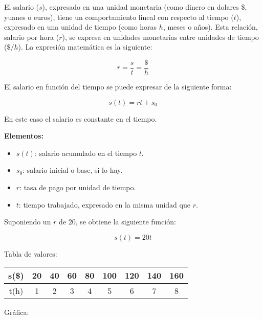 El salario ($s$), expresado en una unidad monetaria (como dinero en dolares \$, yuanes o euros), tiene un comportamiento lineal con respecto al tiempo ($t$), expresado en una unidad de tiempo (como horas $h$, meses o años). Esta relación, salario por hora ($r$), se expresa en unidades monetarias entre unidades de tiempo ($\$/h$). La expresión matemática es la siguiente:

\[
  r = \dfrac{s}{t} = \dfrac{\$}{h}
\]

El salario en función del tiempo se puede expresar de la siguiente forma:

\[\boxed{
  s(t) = rt + s_0
}\]

En este caso el salario es constante en el tiempo.

\textbf{Elementos:}

\begin{itemize}
  \item $s(t)$: salario acumulado en el tiempo $t$.
  \item $s_0$: salario inicial o base, si lo hay.
  \item $r$: tasa de pago por unidad de tiempo.
  \item $t$: tiempo trabajado, expresado en la misma unidad que $r$.
\end{itemize}

Suponiendo un $r$ de 20, se obtiene la siguiente función:

\[
  s(t) = 20t
\]

Tabla de valores:

\begin{center}
\begin{tabular}{|c|c|c|c|c|c|c|c|c|}
  \hline
  s(\$) & 20 & 40 & 60 & 80 & 100 & 120 & 140 & 160 \\
  \hline
  t(h) & 1 & 2 & 3 & 4 & 5 & 6 & 7 & 8 \\
  \hline
\end{tabular}
\end{center}

Gráfica:

